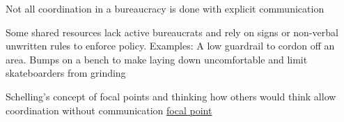 Not all coordination in a bureaucracy is done with explicit communication

Some shared resources lack active bureaucrats and rely on signs or non-verbal unwritten rules to enforce policy.
Examples:
A low guardrail to cordon off an area. 
Bumps on a bench to make laying down uncomfortable and limit skateboarders from grinding 

Schelling's concept of focal points and thinking how others would think allow coordination without communication
\href{https://en.wikipedia.org/wiki/Focal_point_(game_theory)}{focal point}